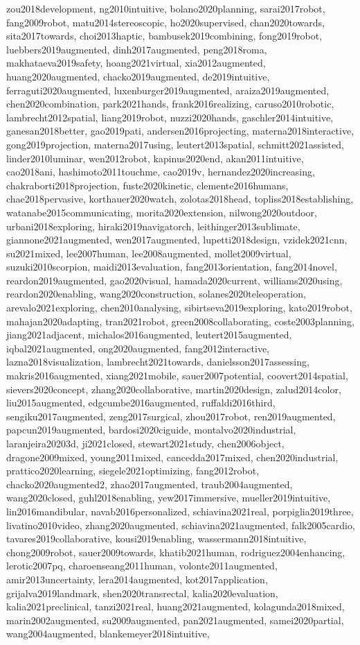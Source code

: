 \begin{table*}[t]
\begin{tabular}{ \TableConfig }
zou2018development, ng2010intuitive, bolano2020planning, sarai2017robot, fang2009robot, matu2014stereoscopic, ho2020supervised, chan2020towards, sita2017towards, choi2013haptic, bambusek2019combining, fong2019robot, luebbers2019augmented, dinh2017augmented, peng2018roma, makhataeva2019safety, hoang2021virtual, xia2012augmented, huang2020augmented, chacko2019augmented, de2019intuitive, ferraguti2020augmented, luxenburger2019augmented, araiza2019augmented, chen2020combination, park2021hands, frank2016realizing, caruso2010robotic, lambrecht2012spatial, liang2019robot, nuzzi2020hands, gaschler2014intuitive, ganesan2018better, gao2019pati, andersen2016projecting, materna2018interactive, gong2019projection, materna2017using, leutert2013spatial, schmitt2021assisted, linder2010luminar, wen2012robot, kapinus2020end, akan2011intuitive, cao2018ani, hashimoto2011touchme, cao2019v, hernandez2020increasing, chakraborti2018projection, fuste2020kinetic, clemente2016humans, chae2018pervasive, korthauer2020watch, zolotas2018head, topliss2018establishing, watanabe2015communicating, morita2020extension, nilwong2020outdoor, urbani2018exploring, hiraki2019navigatorch, leithinger2013sublimate, giannone2021augmented, wen2017augmented, lupetti2018design, vzidek2021cnn, su2021mixed, lee2007human, lee2008augmented, mollet2009virtual, suzuki2010scorpion, maidi2013evaluation, fang2013orientation, fang2014novel, reardon2019augmented, gao2020visual, hamada2020current, williams2020using, reardon2020enabling, wang2020construction, solanes2020teleoperation, arevalo2021exploring, chen2010analysing, sibirtseva2019exploring, kato2019robot, mahajan2020adapting, tran2021robot, green2008collaborating, coste2003planning, jiang2021adjacent, michalos2016augmented, leutert2015augmented, iqbal2021augmented, ong2020augmented, fang2012interactive, lazna2018visualization, lambrecht2021towards, danielsson2017assessing, makris2016augmented, xiang2021mobile, sauer2007potential, coovert2014spatial, sievers2020concept, zhang2020collaborative, martin2020design, zalud2014color, liu2015augmented, edgcumbe2016augmented, ruffaldi2016third, sengiku2017augmented, zeng2017surgical, zhou2017robot, ren2019augmented, papcun2019augmented, bardosi2020ciguide, montalvo2020industrial, laranjeira20203d, ji2021closed, stewart2021study, chen2006object, dragone2009mixed, young2011mixed, cancedda2017mixed, chen2020industrial, prattico2020learning, siegele2021optimizing, fang2012robot, chacko2020augmented2, zhao2017augmented, traub2004augmented, wang2020closed, guhl2018enabling, yew2017immersive, mueller2019intuitive, lin2016mandibular, navab2016personalized, schiavina2021real, porpiglia2019three, livatino2010video, zhang2020augmented, schiavina2021augmented, falk2005cardio, tavares2019collaborative, kousi2019enabling, wassermann2018intuitive, chong2009robot, sauer2009towards, khatib2021human, rodriguez2004enhancing, lerotic2007pq, charoenseang2011human, volonte2011augmented, amir2013uncertainty, lera2014augmented, kot2017application, grijalva2019landmark, shen2020transrectal, kalia2020evaluation, kalia2021preclinical, tanzi2021real, huang2021augmented, kolagunda2018mixed, marin2002augmented, su2009augmented, pan2021augmented, samei2020partial, wang2004augmented, blankemeyer2018intuitive, 
\end{tabular}
\end{table*}
